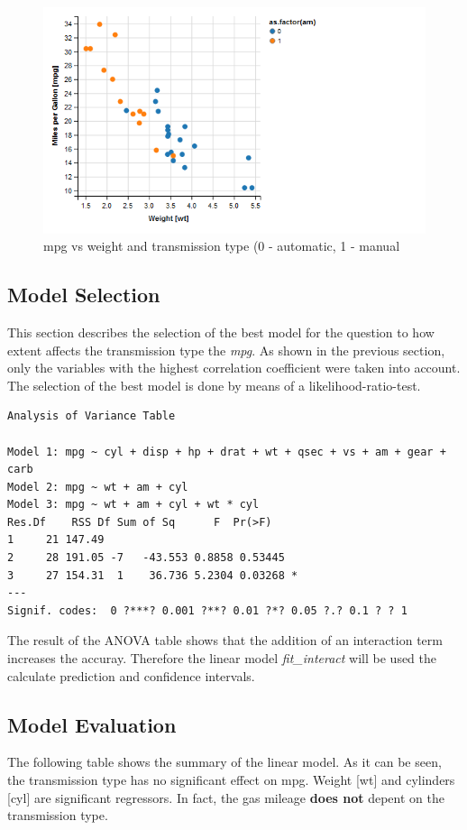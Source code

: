 \documentclass[10pt,a4paper]{article}
\begin{document}
	\begin{figure}
\centering
\includegraphics{Rplot}
\caption[mpg vs weight and transmission type (0 - automatic, 1 - manual)]{mpg vs weight and transmission type (0 - automatic, 1 - manual}

\end{figure}
	
\subsection{Model Selection}

This section describes the selection of the best model for the question to how extent affects the transmission type the \textit{mpg}. As shown in the previous section, only the variables with the highest correlation coefficient were taken into account. The selection of the best model is done by means of a likelihood-ratio-test.

\begin{verbatim}
Analysis of Variance Table

Model 1: mpg ~ cyl + disp + hp + drat + wt + qsec + vs + am + gear + carb
Model 2: mpg ~ wt + am + cyl
Model 3: mpg ~ wt + am + cyl + wt * cyl
Res.Df    RSS Df Sum of Sq      F  Pr(>F)  
1     21 147.49                              
2     28 191.05 -7   -43.553 0.8858 0.53445  
3     27 154.31  1    36.736 5.2304 0.03268 *
---
Signif. codes:  0 ?***? 0.001 ?**? 0.01 ?*? 0.05 ?.? 0.1 ? ? 1
\end{verbatim}
The result of the ANOVA table shows that the addition of an interaction term increases the accuray. Therefore the linear model \textit{fit\_interact} will be used the calculate prediction and confidence intervals.

\subsection{Model Evaluation}
The following table shows the summary of the linear model. As it can be seen, the transmission type has no significant effect on mpg. Weight [wt] and cylinders [cyl] are significant regressors. 
In fact, the gas mileage \textbf{does not} depent on the transmission type.
		
\end{document}
